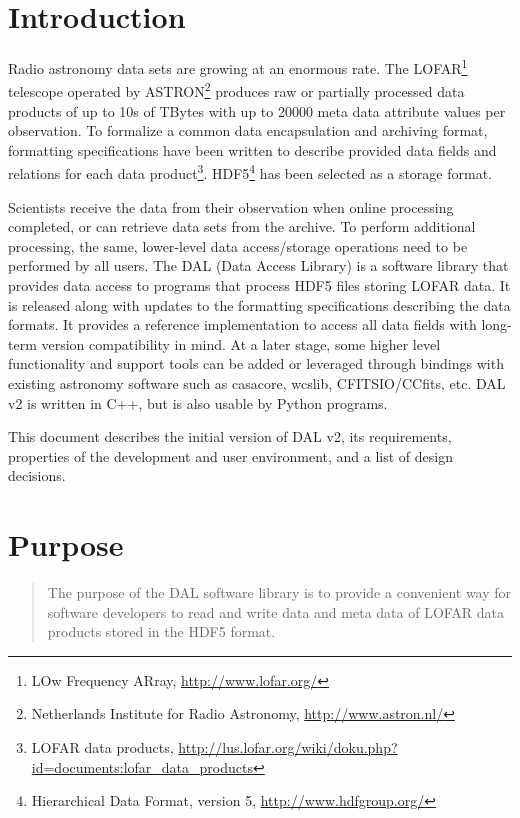 \documentclass[a4paper,11pt]{article}
\begin{document}
\maketitle

\tableofcontents

\section{Introduction} \label{sec:intro}
Radio astronomy data sets are growing at an enormous rate. 
The LOFAR\footnote{LOw Frequency ARray, \url{http://www.lofar.org/}} telescope operated by ASTRON\footnote{Netherlands Institute for Radio Astronomy, \url{http://www.astron.nl/}} produces raw or partially processed data products of up to 10s of TBytes with up to 20000 meta data attribute values per observation.
To formalize a common data encapsulation and archiving format, formatting specifications have been written to describe provided data fields and relations for each data product\footnote{LOFAR data products, \url{http://lus.lofar.org/wiki/doku.php?id=documents:lofar_data_products}}.
HDF5\footnote{Hierarchical Data Format, version 5, \url{http://www.hdfgroup.org/}} has been selected as a storage format.

Scientists receive the data from their observation when online processing completed, or can retrieve data sets from the archive.
To perform additional processing, the same, lower-level data access/storage operations need to be performed by all users.
The DAL (Data Access Library) is a software library that provides data access to programs that process HDF5 files storing LOFAR data.
It is released along with updates to the formatting specifications describing the data formats.
It provides a reference implementation to access all data fields with long-term version compatibility in mind.
At a later stage, some higher level functionality and support tools can be added or leveraged through bindings with existing astronomy software such as casacore, wcslib, CFITSIO/CCfits, etc.
DAL v2 is written in C++, but is also usable by Python programs.

This document describes the initial version of DAL v2, its requirements, properties of the development and user environment, and a list of design decisions.


\section{Purpose} \label{sec:purpose}
\begin{quote}
The purpose of the DAL software library is to provide a convenient way for software developers to read and write data and meta data of LOFAR data products stored in the HDF5 format.
\end{quote}
\end{document}
